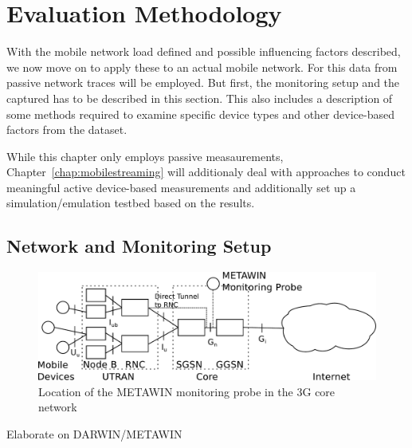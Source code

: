\section{Evaluation Methodology}
\label{c4:methodology}

With the mobile network load defined and possible influencing factors described, we now move on to apply these to an actual mobile network. For this data from passive network traces will be employed. But first, the monitoring setup and the captured has to be described in this section. This also includes a description of some methods required to examine specific device types and other device-based factors from the dataset.

While this chapter only employs passive measaurements, Chapter~\ref{chap:mobilestreaming} will additionaly deal with approaches to conduct meaningful active device-based measurements and additionally set up a simulation/emulation testbed based on the results.

\subsection{Network and Monitoring Setup}



\begin{figure}[htb]
	\centering
	\includegraphics[width=1.0\textwidth]{images/umts-network.pdf}
	\caption{Location of the \acrshort{METAWIN} monitoring probe in the \gls{3G} core network}
	\label{c4:fig:umtsnetwork}
\end{figure}



Elaborate on DARWIN/METAWIN

